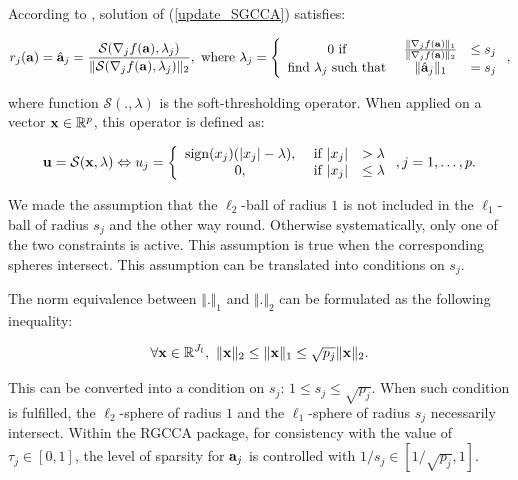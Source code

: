\documentclass[
]{jss}
\begin{document}
According to \citep{Witten2009a}, solution of (\ref{update_SGCCA})
satisfies:

\begin{equation}
    r_j(\mathbf{a}) = \hat{\mathbf{a}}_j = \frac{\mathcal{S}(\nabla_j f(\mathbf{a}), \lambda_j)}{\Vert \mathcal{S}(\nabla_j f(\mathbf{a}), \lambda_j)\Vert_2}, ~\text{where}~ \lambda_j = \left\lbrace\begin{array}{ccc}
    0 ~ \text{if}~ & \frac{\Vert \nabla_j f(\mathbf{a}) \Vert_1}{\Vert \nabla_j f(\mathbf{a}) \Vert_2} & \leq s_j\\
    \text{find}~ \lambda_j ~\text{such that}~ & \Vert \hat{\mathbf{a}}_j \Vert_1 & = s_j \end{array}\right.,
    \label{SGCCA_sol}
\end{equation}

where function \(\mathcal{S}(., \lambda)\) is the soft-thresholding
operator. When applied on a vector \(\mathbf{x}\in\mathbb{R}^p\), this operator
is defined as:

\begin{equation}
    \mathbf{u} = \mathcal{S}(\mathbf{x}, \lambda) \Leftrightarrow u_j = \left\lbrace
    \begin{array}{ccc}
        \mathrm{sign}(x_j)(|x_j| -  \lambda), &~ \text{if}~ |x_j| &> \lambda\\
        0, &~ \text{if}~ |x_j| &\leq \lambda\\ 
    \end{array}\right., j = 1, \ldots, p.
\end{equation}

We made the assumption that the \(\ell_2\)-ball of radius \(1\) is not
included in the \(\ell_1\)-ball of radius \(s_j\) and the other way
round. Otherwise systematically, only one of the two constraints is
active. This assumption is true when the corresponding spheres
intersect. This assumption can be translated into conditions on \(s_j\).

The norm equivalence between \(\Vert . \Vert_1\) and \(\Vert . \Vert_2\)
can be formulated as the following inequality:

\begin{equation}
    \forall \mathbf{x} \in \mathbb{R}^{J_l}, ~ \Vert \mathbf{x} \Vert_2 \leq \Vert \mathbf{x} \Vert_1 \leq \sqrt{p_j}\Vert \mathbf{x} \Vert_2.
\label{existence_conditions}
\end{equation}

This can be converted into a condition on \(s_j\):
\(1 \leq s_j \leq \sqrt{p_j}\). When such condition is fulfilled, the
\(\ell_2\)-sphere of radius \(1\) and the \(\ell_1\)-sphere of radius
\(s_j\) necessarily intersect. Within the RGCCA package, for consistency
with the value of \(\tau_j \in [0, 1]\), the level of sparsity for
\(\mathbf{a}_j\) is controlled with \(1/s_j \in [1/\sqrt{p_j}, 1]\).
\end{document}
